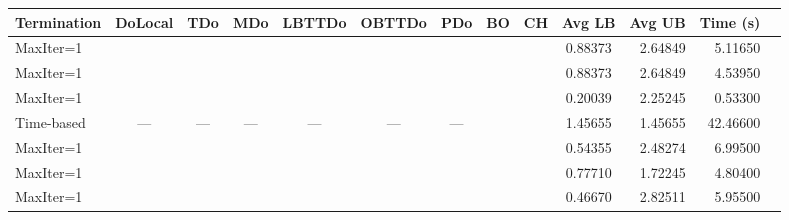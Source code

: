 \documentclass[11pt,reqno,a4paper]{amsart}
\numberwithin{equation}{section}
\theoremstyle{mytheorem}
\theoremstyle{myremark}
\theoremstyle{myparagraph}
\newcommand{\yes}{\ding{51}}
\newcommand{\no}{\ding{55}}
\newcommand{\na}{---} %
\begin{document}
    \begin{table}[ht]
        \centering
        \scriptsize
        \renewcommand{\arraystretch}{1.2}
        \setlength{\tabcolsep}{4pt}
        \begin{threeparttable}
            \begin{tabular}{l c c c c c c c c c r r r}
                \toprule
                \textbf{Termination} & \textbf{DoLocal} & \textbf{TDo} & \textbf{MDo} & \textbf{LBTTDo} & \textbf{OBTTDo} & \textbf{PDo} & \textbf{BO} & \textbf{CH} & \textbf{Avg LB} & \textbf{Avg UB} & \textbf{Time (s)} \\
                \midrule
                 MaxIter=1            & \yes             & \yes         & \yes         & \yes            & \yes            & \yes         & \no                 & \no                  & 0.88373         & 2.64849         & 5.11650           \\
                 MaxIter=1            & \no              & \no          & \no          & \yes            & \no             & \no          & \no                 & \no                  & 0.88373         & 2.64849         & 4.53950           \\
                 MaxIter=1            & \yes             & \yes         & \yes         & \no             & \yes            & \yes         & \no                 & \no                  & 0.20039         & 2.25245         & 0.53300 \\
                 Time-based           & \na              & \na          & \na          & \na             & \na             & \na          & \no                 & \no                  & 1.45655         & 1.45655         & 42.46600          \\
                 MaxIter=1            & \yes             & \yes         & \yes         & \yes            & \yes            & \yes         & \yes                & \no                  & 0.54355         & 2.48274         & 6.99500           \\
                 MaxIter=1            & \yes             & \yes         & \yes         & \yes            & \yes            & \yes         & \no                 & \yes                 & 0.77710         & 1.72245         & 4.80400           \\
                 MaxIter=1            & \yes             & \yes         & \yes         & \yes            & \yes            & \yes         & \yes                & \yes                 & 0.46670         & 2.82511 & 5.95500 \\

\end{tabular}
\end{threeparttable}
\end{table}
\end{document}
